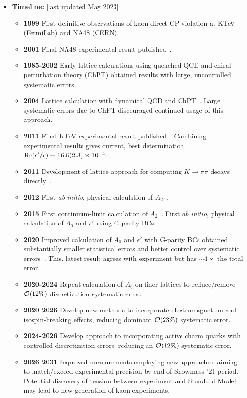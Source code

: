 \documentclass[12pt,hyperpdf]{article}
\begin{document}
\begin{itemize}
\item{\bf Timeline:} \hfill [last updated May 2023]
\begin{itemize}
    \item{\bf 1999} First definitive observations of kaon direct CP-violation at KTeV (FermiLab) and NA48 (CERN).
    \item{\bf 2001} Final NA48 experimental result published~\cite{NA48:2001bct}.
    \item{\bf 1985-2002} Early lattice calculations using quenched QCD and chiral perturbation theory (ChPT) obtained results with large, uncontrolled systematic errors.
    \item{\bf 2004} Lattice calculation with dynamical QCD and ChPT~\cite{Li:2008kc}. Large systematic errors due to ChPT discouraged continued usage of this approach.
    \item{\bf 2011} Final KTeV experimental result published~\cite{KTeV:2010sng}. Combining experimental results gives current, best determination ${\rm Re}(\epsilon'/\epsilon)=16.6(2.3)\times 10^{-4}$.
    \item{\bf 2011} Development of lattice approach for computing $K\to\pi\pi$ decays directly~\cite{Blum:2011pu}.
    \item{\bf 2012} First {\it ab initio}, physical calculation of $A_2$~\cite{Blum:2011ng,Blum:2012uk}.
    \item{\bf 2015} First continuum-limit calculation of $A_2$~\cite{Blum:2015ywa}. First {\it ab initio}, physical calculation of $A_0$ and $\epsilon'$ using G-parity BCs~\cite{RBC:2015gro}.
    \item{\bf 2020} Improved calculation of $A_0$ and $\epsilon'$ with G-parity BCs obtained substantially smaller statistical errors and better control over systematic errors~\cite{RBC:2020kdj}. This, latest result agrees with experiment but has ${\sim}4\times$ the total error.
    \item{\bf 2020-2024} Repeat calculation of $A_0$ on finer lattices to reduce/remove ${\cal O}(12\%)$ discretization systematic error.
    \item{\bf 2020-2026} Develop new methods to incorporate electromagnetism and isospin-breaking effects, reducing dominant ${\cal O}(23\%)$ systematic error.
    \item{\bf 2024-2026} Develop approach to incorporating active charm quarks with controlled discretization errors, reducing an ${\cal O}(12\%)$ systematic error.
    \item{\bf 2026-2031} Improved measurements employing new approaches, aiming to match/exceed experimental precision by end of Snowmass '21 period. Potential discovery of tension between experiment and Standard Model may lead to new generation of kaon experiments.
\end{itemize}
\end{itemize}
\end{document}
